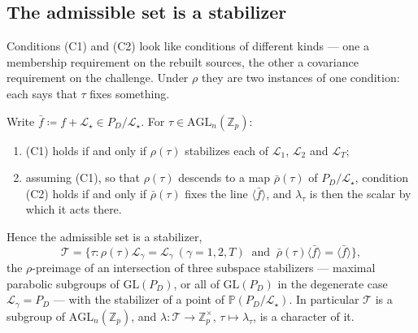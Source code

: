 \documentclass{aicr-solution}
\newcommand{\Zp}{\mathbb{Z}_p}
\newcommand{\Zpx}{\mathbb{Z}_p^{\times}}
\newcommand{\LL}{\mathcal{L}}
\newcommand{\Span}[1]{\langle #1 \rangle} %
\newcommand{\GL}{\mathrm{GL}}
\newcommand{\AGL}{\mathrm{AGL}}
\newcommand{\PP}{\mathbb{P}}
\begin{document}
\subsection{The admissible set is a stabilizer}

Conditions \textup{(C1)} and \textup{(C2)} look like conditions of different kinds --- one a
membership requirement on the rebuilt sources, the other a covariance requirement on the
challenge. Under $\rho$ they are two instances of one condition: each says that $\tau$ fixes
something.

\begin{lemma}
\label{lem:stab}
Write $\bar f\coloneqq f+\LL_\star\in P_D/\LL_\star$. For $\tau\in\AGL_n(\Zp)$:
\begin{enumerate}[label=\textup{(\roman*)},leftmargin=2.6em,itemsep=2pt]
  \item \textup{(C1)} holds if and only if $\rho(\tau)$ stabilizes each of $\LL_1$, $\LL_2$ and
        $\LL_T$;
  \item assuming \textup{(C1)}, so that $\rho(\tau)$ descends to a map $\bar\rho(\tau)$ of
        $P_D/\LL_\star$, condition \textup{(C2)} holds if and only if $\bar\rho(\tau)$ fixes the
        line $\Span{\bar f}$, and $\lambda_\tau$ is then the scalar by which it acts there.
\end{enumerate}
Hence the admissible set is a stabilizer,
\[
  \mathcal T=\bigl\{\tau:\rho(\tau)\LL_\gamma=\LL_\gamma\ (\gamma=1,2,T)
  \ \text{ and }\ \bar\rho(\tau)\Span{\bar f}=\Span{\bar f}\bigr\},
\]
the $\rho$-preimage of an intersection of three subspace stabilizers --- maximal parabolic
subgroups of $\GL(P_D)$, or all of $\GL(P_D)$ in the degenerate case $\LL_\gamma=P_D$ ---
with the stabilizer of a point of $\PP(P_D/\LL_\star)$. In particular $\mathcal T$ is a subgroup
of $\AGL_n(\Zp)$, and $\lambda\colon\mathcal T\to\Zpx$, $\tau\mapsto\lambda_\tau$, is a
character of it.
\end{lemma}
\end{document}
